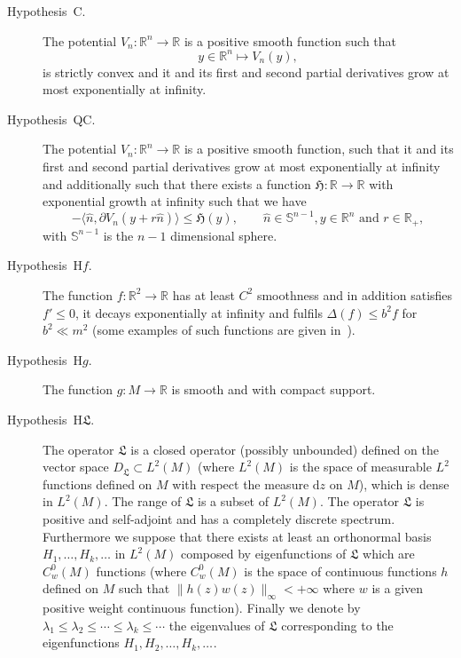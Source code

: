 \documentclass[a4paper,10pt]{article}
\newcommand{\mathd}{\mathrm{d}}
\newcommand{\descriptionparagraphs}[1]{\begin{description}#1\end{description}}
\begin{document}
{\descriptionparagraphs{\item[Hypothesis~C.] The potential $V_n :
\mathbb{R}^n \rightarrow \mathbb{R}$ is a positive smooth function such that
\[ y \in \mathbb{R}^n \mapsto V_n (y), \]
is strictly convex and it and its first and second partial derivatives grow at
most exponentially at infinity.

\item[Hypothesis~QC.] The potential $V_n : \mathbb{R}^n \rightarrow
\mathbb{R}$ is a positive smooth function, such that it and its first and
second partial derivatives grow at most exponentially at infinity and
additionally such that there exists a function $\mathfrak{H} : \mathbb{R}
\rightarrow \mathbb{R}$ with exponential growth at infinity such that we have
\[ - \langle \hat{n}, \partial V_n (y + r \hat{n}) \rangle \leqslant
   \mathfrak{H} (y), \qquad \text{$\hat{n} \in \mathbb{S}^{n - 1}, y \in
   \mathbb{R}^n$ and $r \in \mathbb{R}_+$}, \]
with $\mathbb{S}^{n - 1}$ is the $n - 1$ dimensional sphere.

\item[Hypothesis~H$f$.] The function $f : \mathbb{R}^2 \rightarrow \mathbb{R}$
has at least $C^2$ smoothness and in addition satisfies $f' \leqslant 0$, it
decays exponentially at infinity and fulfils $\Delta (f) \leqslant b^2 f$ for
$b^2 \ll m^2$ (some examples of such functions are given
in~{\cite{Klein1984}}).

\item[Hypothesis~H$g$.] The function $g : M \rightarrow \mathbb{R}$ is smooth
and with compact support.

\item[Hypothesis~H$\mathfrak{L}$.] The operator $\mathfrak{L}$ is a closed
operator (possibly unbounded) defined on the vector space $D_{\mathfrak{L}}
\subset L^2 (M)$ (where $L^2 (M)$ is the space of measurable $L^2$ functions
defined on $M$ with respect the measure $\mathd z$ on $M$), which is dense in
$L^2 (M)$. The range of $\mathfrak{L}$ is a subset of $L^2 (M)$. The operator
$\mathfrak{L}$ is positive and self-adjoint and has a completely discrete
spectrum. Furthermore we suppose that there exists at least an orthonormal
basis $H_1, \ldots, H_k, \ldots$ in $L^2 (M)$ composed by eigenfunctions of
$\mathfrak{L}$ which are $C^0_w (M)$ functions (where $C^0_w (M)$ is the space
of continuous functions $h$ defined on $M$ such that $\| h (z) w (z)
\|_{\infty} < + \infty$ where $w$ is a given positive weight continuous
function). Finally we denote by $\lambda_1 \leqslant \lambda_2 \leqslant
\cdots \leqslant \lambda_k \leqslant \cdots$ the eigenvalues of $\mathfrak{L}$
corresponding to the eigenfunctions $H_1, H_2, \ldots, H_k, \ldots_{}$.

}}
\end{document}
